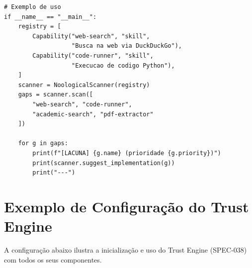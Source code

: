 \begin{lstlisting}[caption={Scanner epistemologico simplificado},
                   label={cod:scanner}, style=pythonstyle]
# Exemplo de uso
if __name__ == "__main__":
    registry = [
        Capability("web-search", "skill",
                   "Busca na web via DuckDuckGo"),
        Capability("code-runner", "skill",
                   "Execucao de codigo Python"),
    ]
    scanner = NoologicalScanner(registry)
    gaps = scanner.scan([
        "web-search", "code-runner",
        "academic-search", "pdf-extractor"
    ])

    for g in gaps:
        print(f"[LACUNA] {g.name} (prioridade {g.priority})")
        print(scanner.suggest_implementation(g))
        print("---")
\end{lstlisting}

\section{Exemplo de Configuração do Trust Engine}
\label{sec:cod-trust}

A configuração abaixo ilustra a inicialização e uso do Trust Engine
(SPEC-038) com todos os seus componentes.


